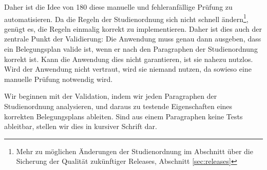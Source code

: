 \documentclass[ngerman]{article}
\begin{document}
Daher ist die Idee von 180 diese manuelle und fehleranfällige Prüfung zu automatisieren.
Da die Regeln der Studienordnung sich nicht schnell ändern\footnote{Mehr zu möglichen Änderungen der Studienordnung im Abschnitt über die Sicherung der Qualität zukünftiger Releases, Abschnitt \ref{sec:releases}}, genügt es, die Regeln einmalig korrekt zu implementieren.
Daher ist dies auch der zentrale Punkt der Validierung:
Die Anwendung muss genau dann ausgeben, dass ein Belegungsplan valide ist, wenn er nach den Paragraphen der Studienordnung korrekt ist.
Kann die Anwendung dies nicht garantieren, ist sie nahezu nutzlos.
Wird der Anwendung nicht vertraut, wird sie niemand nutzen, da sowieso eine manuelle Prüfung notwendig wird.

Wir beginnen mit der Validation, indem wir jeden Paragraphen der Studienordnung analysieren, und daraus zu testende Eigenschaften eines korrekten Belegungsplans ableiten.
Sind aus einem Paragraphen keine Tests ableitbar, stellen wir dies in kursiver Schrift dar.

\setlength{\parindent}{0cm}
\end{document}
